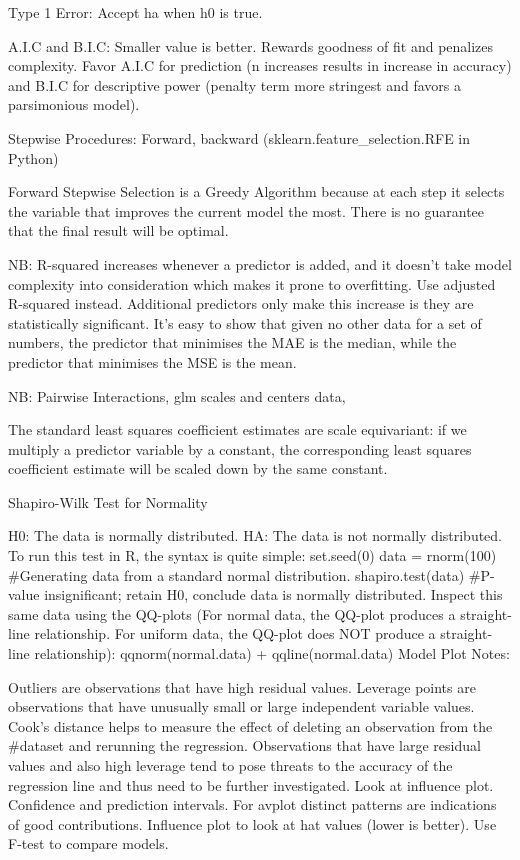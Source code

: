 \documentclass[]{book}
\theoremstyle{definition}
\theoremstyle{definition}
\theoremstyle{definition}
\theoremstyle{remark}
\begin{document}
Type 1 Error: Accept ha when h0 is true.

A.I.C and B.I.C: Smaller value is better. Rewards goodness of fit and
penalizes complexity. Favor A.I.C for prediction (n increases results in
increase in accuracy) and B.I.C for descriptive power (penalty term more
stringest and favors a parsimonious model).

Stepwise Procedures: Forward, backward (sklearn.feature\_selection.RFE
in Python)

Forward Stepwise Selection is a Greedy Algorithm because at each step it
selects the variable that improves the current model the most. There is
no guarantee that the final result will be optimal.

NB: R-squared increases whenever a predictor is added, and it doesn't
take model complexity into consideration which makes it prone to
overfitting. Use adjusted R-squared instead. Additional predictors only
make this increase is they are statistically significant. It's easy to
show that given no other data for a set of numbers, the predictor that
minimises the MAE is the median, while the predictor that minimises the
MSE is the mean.

NB: Pairwise Interactions, glm scales and centers data,

The standard least squares coefficient estimates are scale equivariant:
if we multiply a predictor variable by a constant, the corresponding
least squares coefficient estimate will be scaled down by the same
constant.

Shapiro-Wilk Test for Normality

H0: The data is normally distributed. HA: The data is not normally
distributed. To run this test in R, the syntax is quite simple:
set.seed(0) data = rnorm(100) \#Generating data from a standard normal
distribution. shapiro.test(data) \#P-value insignificant; retain H0,
conclude data is normally distributed. Inspect this same data using the
QQ-plots (For normal data, the QQ-plot produces a straight-line
relationship. For uniform data, the QQ-plot does NOT produce a
straight-line relationship): qqnorm(normal.data) + qqline(normal.data)
Model Plot Notes:

Outliers are observations that have high residual values. Leverage
points are observations that have unusually small or large independent
variable values. Cook's distance helps to measure the effect of deleting
an observation from the \#dataset and rerunning the regression.
Observations that have large residual values and also high leverage tend
to pose threats to the accuracy of the regression line and thus need to
be further investigated. Look at influence plot. Confidence and
prediction intervals. For avplot distinct patterns are indications of
good contributions. Influence plot to look at hat values (lower is
better). Use F-test to compare models.
\end{document}
